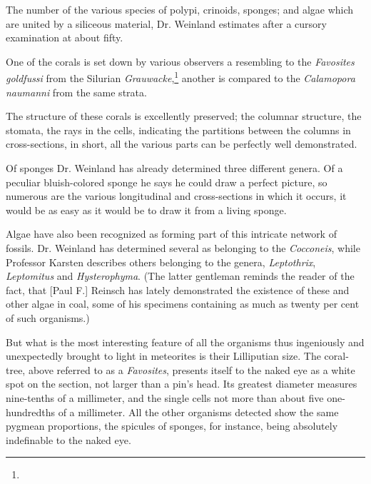 \documentclass[a4paper, 12pt, oneside]{article}
\begin{document}
The number of the various species of polypi, crinoids, sponges; and algae which are united by a siliceous material, Dr. Weinland estimates after a cursory examination at about fifty.

One of the corals is set down by various observers a resembling to the \emph{Favosites goldfussi} from the Silurian \emph{Grauwacke},\footnote{} another is compared to the \emph{Calamopora naumanni} from the same strata.

The structure of these corals is excellently preserved; the columnar structure, the stomata, the rays in the cells, indicating the partitions between the columns in cross-sections, in short, all the various parts can be perfectly well demonstrated.

Of sponges Dr. Weinland has already determined three different genera. Of a peculiar bluish-colored sponge he says he could draw a perfect picture, so numerous are the various longitudinal and cross-sections in which it occurs, it would be as easy as it would be to draw it from a living sponge.

Algae have also been recognized as forming part of this intricate network of fossils. Dr. Weinland has determined several as belonging to the \emph{Cocconeis}, while Professor Karsten describes others belonging to the genera, \emph{Leptothrix}, \emph{Leptomitus} and \emph{Hysterophyma}. (The latter gentleman reminds the reader of the fact, that [Paul F.] Reinsch has lately demonstrated the existence of these and other algae in coal, some of his specimens containing as much as twenty per cent of such organisms.)

But what is the most interesting feature of all the organisms thus ingeniously and unexpectedly brought to light in meteorites is their Lilliputian size. The coral-tree, above referred to as a \emph{Favosites}, presents itself to the naked eye as a white spot on the section, not larger than a pin's head. Its greatest diameter measures nine-tenths of a millimeter, and the single cells not more than about five one-hundredths of a millimeter. All the other organisms detected show the same pygmean proportions, the spicules of sponges, for instance, being absolutely indefinable to the naked eye.
\end{document}
